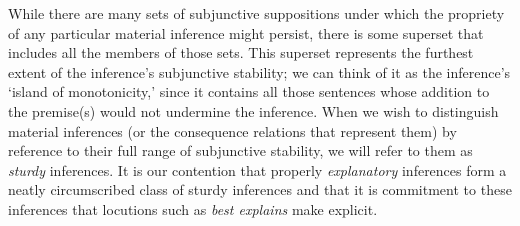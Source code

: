 \documentclass{svjour3}                     %
\begin{document}
While there are many sets of subjunctive suppositions under which the propriety of any particular material inference might persist, there is some superset that includes all the members of those sets. This superset represents the furthest extent of the inference's subjunctive stability; we can think of it as the inference's `island of monotonicity,' since it contains all those sentences whose addition to the premise(s) would not undermine the inference. When we wish to distinguish material inferences (or the consequence relations that represent them) by reference to their full range of subjunctive stability, we will refer to them as \textit{sturdy} inferences. It is our contention that properly \textit{explanatory} inferences form a neatly circumscribed class of sturdy inferences and that it is commitment to these inferences that locutions such as  \textit{best explains} make explicit.









 

%
%
%
%
\end{document}
